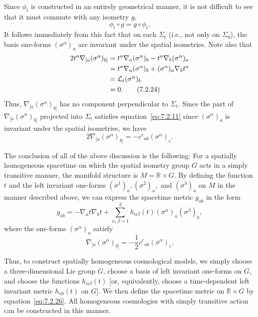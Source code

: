 Since \(\phi_t\) is constructed in an entirely geometrical manner, it is not difficult
to see that it must commute with any isometry \(g\),
\begin{equation}
  \phi_t\circ g=g\circ\phi_t .
  \tag{7.2.23}\label{eq:7.2.23}
\end{equation}
It follows immediately from this fact that on each \(\Sigma_t\) (i.e., not only on
\(\Sigma_0\)), the basis one-forms \((\sigma^\alpha)_a\) are invariant under the
spatial isometries. Note also that
\begin{align}
  2t^a\nabla_{[a}(\sigma^\alpha)_{b]}
    &=t^a\nabla_a(\sigma^\alpha)_b
      -t^a\nabla_b(\sigma^\alpha)_a \notag\\
    &=t^a\nabla_a(\sigma^\alpha)_b
      +(\sigma^\alpha)_a\nabla_bt^a \notag\\
    &=\mathcal L_t(\sigma^\alpha)_b \notag\\
    &=0 .
  \tag{7.2.24}\label{eq:7.2.24}
\end{align}
Thus, \(\nabla_{[a}(\sigma^\alpha)_{b]}\) has no component perpendicular to
\(\Sigma_t\). Since the part of \(\nabla_{[a}(\sigma^\alpha)_{b]}\) projected
into \(\Sigma_t\) satisfies equation~\eqref{eq:7.2.11} since
\((\sigma^\alpha)_a\) is invariant under the spatial isometries, we have
\begin{equation}
  2\nabla_{[a}(\sigma^\alpha)_{b]}
    =-c^c{}_{ab}(\sigma^\alpha)_c .
  \tag{7.2.25}\label{eq:7.2.25}
\end{equation}

The conclusion of all of the above discussion is the following: For a spatially
homogeneous spacetime on which the spatial isometry group \(G\) acts in a simply
transitive manner, the manifold structure is \(M=\mathbb R\times G\). By
defining the function \(t\) and the left invariant one-forms
\((\sigma^1)_a,(\sigma^2)_a,\) and \((\sigma^3)_a\) on \(M\) in the manner
described above, we can express the spacetime metric \(g_{ab}\) in the form
\begin{equation}
  g_{ab}=-\nabla_at\nabla_bt
    +\sum_{\alpha,\beta=1}^{3}
      h_{\alpha\beta}(t)(\sigma^\alpha)_a(\sigma^\beta)_b ,
  \tag{7.2.26}\label{eq:7.2.26}
\end{equation}
where the one-forms \((\sigma^\alpha)_a\) satisfy
\begin{equation}
  \nabla_{[a}(\sigma^\alpha)_{b]}
    =-\frac12c^c{}_{ab}(\sigma^\alpha)_c .
  \tag{7.2.27}\label{eq:7.2.27}
\end{equation}

Thus, to construct spatially homogeneous cosmological models, we simply choose a
three-dimensional Lie group \(G\), choose a basis of left invariant one-forms on
\(G\), and choose the functions \(h_{\alpha\beta}(t)\) [or, equivalently, choose a
time-dependent left invariant metric \(h_{ab}(t)\) on \(G\)]. We then define the
spacetime metric on \(\mathbb R\times G\) by equation~\eqref{eq:7.2.26}. All
homogeneous cosmologies with simply transitive action can be constructed in this
manner.

